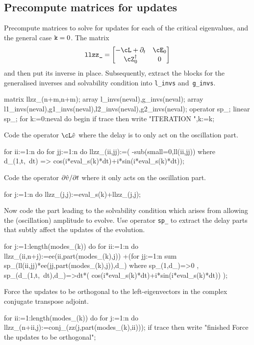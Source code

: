 \documentclass[11pt,a5paper]{article}
\newcommand{\adj}[1]{#1^\dagger} %
\begin{document}
\subsection{Precompute matrices for updates}

Precompute matrices to solve for updates for each of the
critical eigenvalues, and the general case $\verb|k|=0$. The
matrix 
\begin{equation*}
\verb|llzz_| = \begin{bmatrix} -\cL+\partial_t & \cE_0 
\\ \adj\cZ_0 & 0 \end{bmatrix}
\end{equation*}
and then put its inverse in place. Subsequently, extract the
blocks for the generalised inverses and solvability
condition into \verb|l_invs| and~\verb|g_invs|.
\begin{reduce}
matrix llzz_(n+m,n+m);
array l_invs(neval),g_invs(neval);
array l1_invs(neval),g1_invs(neval),l2_invs(neval),g2_invs(neval);
operator sp_; linear sp_;
for k:=0:neval do begin
  if trace then write "ITERATION ",k:=k; 
\end{reduce}

Code the operator \(\cL\hat v\) where the delay is to only
act on the oscillation part.
\begin{reduce}
  for ii:=1:n do for jj:=1:n do llzz_(ii,jj):=(
      -sub(small=0,ll(ii,jj)) where d_(1,t,~dt)
      => cos(i*eval_s(k)*dt)+i*sin(i*eval_s(k)*dt));
\end{reduce}

Code the operator \(\D t{\hat v}\) where it only acts on the
oscillation part.
\begin{reduce}
  for j:=1:n do llzz_(j,j):=eval_s(k)+llzz_(j,j);
\end{reduce}

Now code the part leading to the solvability condition which
arises from allowing the (oscillation) amplitude to evolve.
Use operator \verb|sp_| to extract the delay parts that
subtly affect the updates of the evolution.
\begin{reduce}
  for j:=1:length(modes_(k)) do 
    for ii:=1:n do llzz_(ii,n+j):=ee(ii,part(modes_(k),j))
     +(for jj:=1:n sum 
       sp_(ll(ii,jj)*ee(jj,part(modes_(k),j)),d_)
       where { sp_(1,d_)=>0
             , sp_(d_(1,t,~dt),d_)=>dt*(
               cos(i*eval_s(k)*dt)+i*sin(i*eval_s(k)*dt))
             });
\end{reduce}

Force the updates to be orthogonal to the left-eigenvectors
in the complex conjugate transpose adjoint.
\begin{reduce}
  for ii:=1:length(modes_(k)) do for j:=1:n do 
      llzz_(n+ii,j):=conj_(zz(j,part(modes_(k),ii)));
  if trace then write "finished Force the updates to be orthogonal";
\end{reduce}
\end{document}
